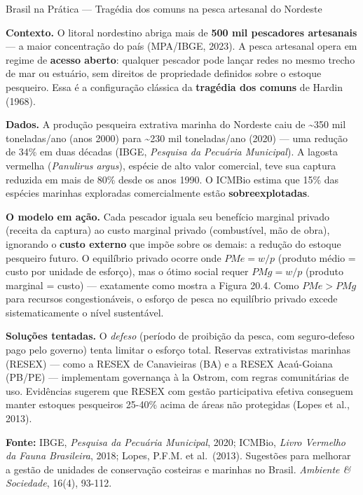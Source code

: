 \documentclass[11pt,twoside,openright]{book}
\begin{document}
\begin{boxbrasilbox}{Brasil na Prática — Tragédia dos comuns na pesca artesanal do Nordeste}

\textbf{Contexto.} O litoral nordestino abriga mais de \textbf{500 mil
pescadores artesanais} --- a maior concentração do país (MPA/IBGE,
2023). A pesca artesanal opera em regime de \textbf{acesso aberto}:
qualquer pescador pode lançar redes no mesmo trecho de mar ou estuário,
sem direitos de propriedade definidos sobre o estoque pesqueiro. Essa é
a configuração clássica da \textbf{tragédia dos comuns} de Hardin
(1968).

\textbf{Dados.} A produção pesqueira extrativa marinha do Nordeste caiu
de \textasciitilde350 mil toneladas/ano (anos 2000) para
\textasciitilde230 mil toneladas/ano (2020) --- uma redução de 34\% em
duas décadas (IBGE, \emph{Pesquisa da Pecuária Municipal}). A lagosta
vermelha (\emph{Panulirus argus}), espécie de alto valor comercial, teve
sua captura reduzida em mais de 80\% desde os anos 1990. O ICMBio estima
que 15\% das espécies marinhas exploradas comercialmente estão
\textbf{sobreexplotadas}.

\textbf{O modelo em ação.} Cada pescador iguala seu benefício marginal
privado (receita da captura) ao custo marginal privado (combustível, mão
de obra), ignorando o \textbf{custo externo} que impõe sobre os demais:
a redução do estoque pesqueiro futuro. O equilíbrio privado ocorre onde
\(PMe = w/p\) (produto médio = custo por unidade de esforço), mas o
ótimo social requer \(PMg = w/p\) (produto marginal = custo) ---
exatamente como mostra a Figura 20.4. Como \(PMe > PMg\) para recursos
congestionáveis, o esforço de pesca no equilíbrio privado excede
sistematicamente o nível sustentável.

\textbf{Soluções tentadas.} O \emph{defeso} (período de proibição da
pesca, com seguro-defeso pago pelo governo) tenta limitar o esforço
total. Reservas extrativistas marinhas (RESEX) --- como a RESEX de
Canavieiras (BA) e a RESEX Acaú-Goiana (PB/PE) --- implementam
governança à la Ostrom, com regras comunitárias de uso. Evidências
sugerem que RESEX com gestão participativa efetiva conseguem manter
estoques pesqueiros 25-40\% acima de áreas não protegidas (Lopes et al.,
2013).

\textbf{Fonte:} IBGE, \emph{Pesquisa da Pecuária Municipal}, 2020;
ICMBio, \emph{Livro Vermelho da Fauna Brasileira}, 2018; Lopes, P.F.M.
et al.~(2013). Sugestões para melhorar a gestão de unidades de
conservação costeiras e marinhas no Brasil. \emph{Ambiente \&
Sociedade}, 16(4), 93-112.

\end{boxbrasilbox}
\end{document}
